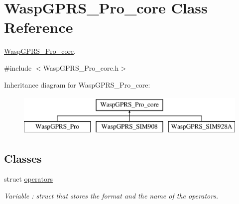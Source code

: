\hypertarget{class_wasp_g_p_r_s___pro__core}{}\section{Wasp\+G\+P\+R\+S\+\_\+\+Pro\+\_\+core Class Reference}
\label{class_wasp_g_p_r_s___pro__core}


\hyperlink{class_wasp_g_p_r_s___pro__core}{Wasp\+G\+P\+R\+S\+\_\+\+Pro\+\_\+core}.  




{\ttfamily \#include $<$Wasp\+G\+P\+R\+S\+\_\+\+Pro\+\_\+core.\+h$>$}

Inheritance diagram for Wasp\+G\+P\+R\+S\+\_\+\+Pro\+\_\+core\+:\begin{figure}[H]
\begin{center}
\leavevmode
\includegraphics[height=2.000000cm]{class_wasp_g_p_r_s___pro__core}
\end{center}
\end{figure}
\subsection*{Classes}
\begin{DoxyCompactItemize}
\item 
struct \hyperlink{struct_wasp_g_p_r_s___pro__core_1_1operators}{operators}
\begin{DoxyCompactList}\small\item\em Variable \+: struct that stores the format and the name of the operators. \end{DoxyCompactList}\end{DoxyCompactItemize}
